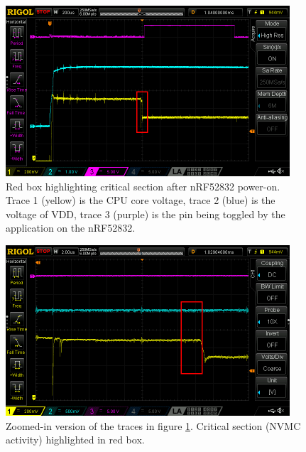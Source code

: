 \begin{figure}
\centering
\includegraphics[width=4.16667in,height=\textheight]{res/nrf52832_crit_section_no_zoom_highlight.png}
\caption{Red box highlighting critical section after nRF52832 power-on.
Trace 1 (yellow) is the CPU core voltage, trace 2 (blue) is the voltage
of VDD, trace 3 (purple) is the pin being toggled by the application on
the nRF52832.\label{img_nrf52832_crit_section_no_zoom}}
\end{figure}

\begin{figure}
\centering
\includegraphics[width=4.16667in,height=\textheight]{res/nrf52832_crit_section_zoom_highlight.png}
\caption{Zoomed-in version of the traces in figure
\ref{img_nrf52832_crit_section_no_zoom}. Critical section (NVMC
activity) highlighted in red box.\label{img_nrf52832_crit_section_zoom}}
\end{figure}

